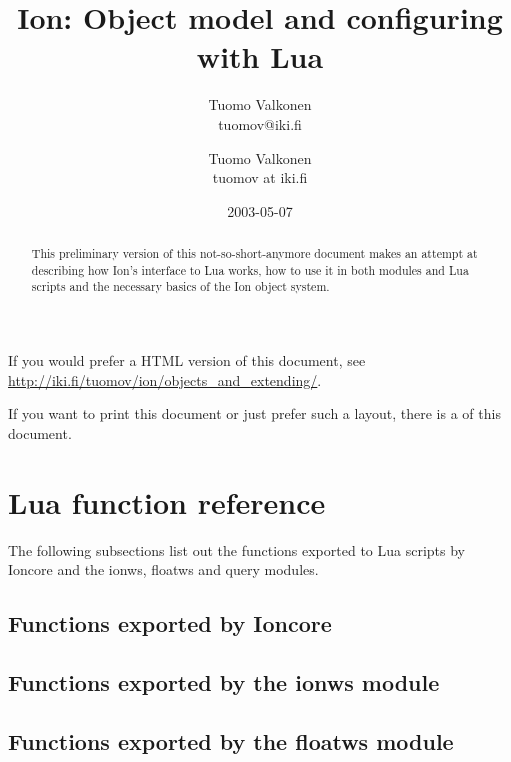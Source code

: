 \documentclass[english,a4paper,11pt,oldtoc]{artikel3}
\title{Ion: Object model and configuring with Lua}
\author{Tuomo Valkonen \\ tuomov@iki.fi}
\author{Tuomo Valkonen \\ tuomov at iki.fi}
\date{2003-05-07}
\begin{document}
\maketitle

\begin{abstract}
This preliminary version of this not-so-short-anymore document makes
an attempt at
describing how Ion's interface to Lua works, how to use it in both
modules and Lua scripts and the necessary basics of the Ion object
system.
\end{abstract}

    If you would prefer a HTML version of this document, see
    \url{http://iki.fi/tuomov/ion/objects_and_extending/}.
\begin{htmlonly}
    If you want to print this document or just prefer such a layout,
    there is a
    of this document.
\end{htmlonly}

\tableofcontents







\section{Lua function reference}
\label{sec:exports}

The following subsections list out the functions exported to Lua scripts
by Ioncore and the ionws, floatws and query modules.

\subsection{Functions exported by Ioncore}
\label{sec:ioncoreref}



\subsection{Functions exported by the ionws module}
\label{sec:ionwsref}



\subsection{Functions exported by the floatws module}
\label{sec:floatwsref}
\end{document}
